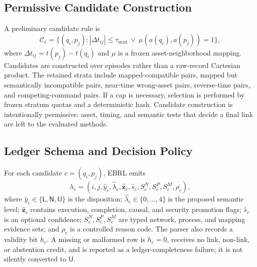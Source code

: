 \documentclass[conference]{IEEEtran}
\begin{document}
\subsection{Permissive Candidate Construction}

A preliminary candidate rule is
\begin{equation}
\mathcal{C}_e=\{(q_i,p_j):|\Delta t_{ij}|\leq\tau_{\max}\ \lor\ \mu(a(q_i),a(p_j))=1\},
\end{equation}
where $\Delta t_{ij}=t(p_j)-t(q_i)$ and $\mu$ is a frozen asset-neighborhood mapping. Candidates are constructed over episodes rather than a raw-record Cartesian product. The retained strata include mapped-compatible pairs, mapped but semantically incompatible pairs, near-time wrong-asset pairs, reverse-time pairs, and competing-command pairs. If a cap is necessary, selection is performed by frozen stratum quotas and a deterministic hash. Candidate construction is intentionally permissive: asset, timing, and semantic tests that decide a final link are left to the evaluated methods.

\subsection{Ledger Schema and Decision Policy}

For each candidate $c=(q_i,p_j)$, EBRL emits
\begin{equation}
\lambda_c=(i,j,\hat y_c,\hat\lambda_c,\hat{\mathbf z}_c,
\hat s_c,S_c^N,S_c^P,S_c^M,\rho_c),
\end{equation}
where $\hat y_c\in\{\mathsf{L},\mathsf{N},\mathsf{U}\}$ is the disposition; $\hat\lambda_c\in\{0,\ldots,4\}$ is the proposed semantic level; $\hat{\mathbf z}_c$ contains execution, completion, causal, and security promotion flags; $\hat s_c$ is an optional confidence; $S_c^N,S_c^P,S_c^M$ are typed network, process, and mapping evidence sets; and $\rho_c$ is a controlled reason code. The parser also records a validity bit $h_c$. A missing or malformed row is $h_c=0$, receives no link, non-link, or abstention credit, and is reported as a ledger-completeness failure; it is not silently converted to $\mathsf{U}$.
\end{document}
